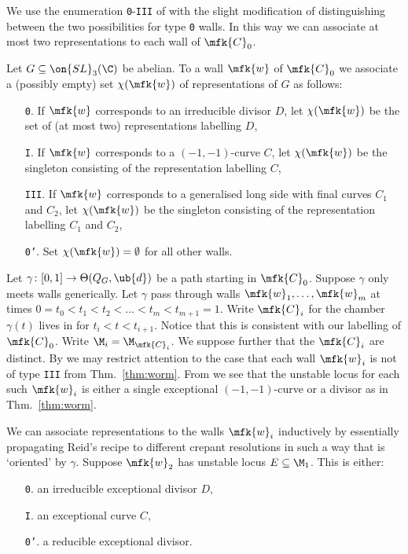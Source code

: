 \documentclass[leqno,11pt,a4paper]{amsart}
\begin{document}
We use the enumeration \texttt{0}-\texttt{III} of \cite{wil_kah_92,ci_flo_04} with the slight modification of distinguishing between the two possibilities for type \texttt{0} walls. In this way we can associate at most two representations to each wall of $\mfk{C}_0$.

\begin{definition} Let $G\subseteq\on{SL}_3(\C)$ be abelian. To a wall $\mfk{w}$ of $\mfk{C}_0$ we associate a (possibly empty) set $\chi(\mfk{w})$ of representations of $G$ as follows:
\begin{enumerate}
\item[\texttt{0}.] If $\mfk{w}$ corresponds to an irreducible divisor $D$, let $\chi(\mfk{w})$ be the set of (at most two) representations labelling $D$,
\item[\texttt{I}.] If $\mfk{w}$ corresponds to a $(-1,-1)$-curve $C$, let $\chi(\mfk{w})$ be the singleton consisting of the representation labelling $C$,
\item[\texttt{III}.] If $\mfk{w}$ corresponds to a generalised long side with final curves $C_1$ and $C_2$, let $\chi(\mfk{w})$ be the singleton consisting of the representation labelling $C_1$ and $C_2$,
\item[\texttt{0'}.] Set $\chi(\mfk{w})=\emptyset$ for all other walls.
\end{enumerate}
\end{definition}

Let $\gamma\colon[0,1]\to\Theta(Q_G,\ub{d})$ be a path starting in $\mfk{C}_0$. Suppose $\gamma$ only meets walls generically. Let $\gamma$ pass through walls $\mfk{w}_1,\dots,\mfk{w}_m$ at times $0=t_0<t_1<t_2<\dots<t_m<t_{m+1}=1$. Write $\mfk{C}_i$ for the chamber $\gamma(t)$ lives in for $t_i<t<t_{i+1}$. Notice that this is consistent with our labelling of $\mfk{C}_0$. Write $\M_i=\M_{\mfk{C}_i}$. We suppose further that the $\mfk{C}_i$ are distinct. By \cite[\S8]{ci_flo_04} we may restrict attention to the case that each wall $\mfk{w}_i$ is not of type \texttt{III} from Thm.~\ref{thm:worm}. From \cite[Prop.~6.1]{ci_flo_04} we see that the unstable locus for each such $\mfk{w}_i$ is either a single exceptional $(-1,-1)$-curve or a divisor as in Thm.~\ref{thm:worm}.

We can associate representations to the walls $\mfk{w}_i$ inductively by essentially propagating Reid's recipe to different crepant resolutions in such a way that is `oriented' by $\gamma$. Suppose $\mfk{w}_2$ has unstable locus $E\subseteq\M_1$. This is either:
\begin{enumerate}
\item[\texttt{0}.] an irreducible exceptional divisor $D$,
\item[\texttt{I}.] an exceptional curve $C$,
\item[\texttt{0'}.] a reducible exceptional divisor.
\end{enumerate}
\end{document}
